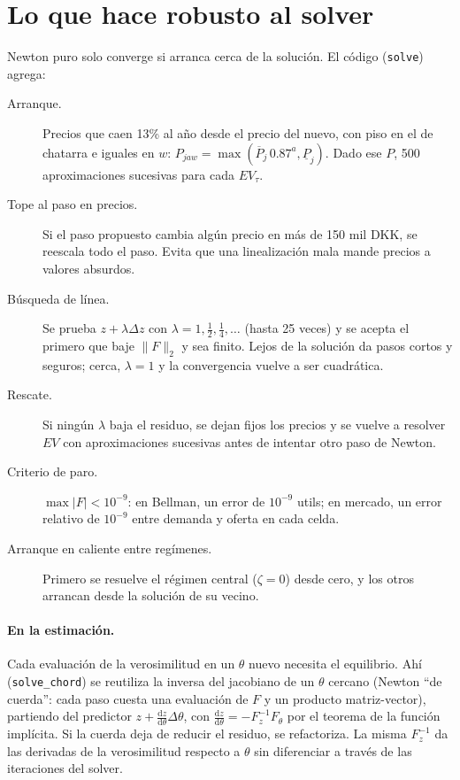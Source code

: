\documentclass{article}
\begin{document}
\section{Lo que hace robusto al solver}

Newton puro solo converge si arranca cerca de la solución. El código (\texttt{solve}) agrega:
\begin{description}
  \item[Arranque.] Precios que caen 13\% al año desde el precio del nuevo, con piso en el de
  chatarra e iguales en $w$: $P_{jaw}=\max(\overline P_j\,0.87^a,\underline P_j)$. Dado ese $P$,
  500 aproximaciones sucesivas para cada $EV_\tau$.
  \item[Tope al paso en precios.] Si el paso propuesto cambia algún precio en más de 150 mil DKK,
  se reescala todo el paso. Evita que una linealización mala mande precios a valores absurdos.
  \item[Búsqueda de línea.] Se prueba $z+\lambda\Delta z$ con $\lambda=1,\tfrac12,\tfrac14,\dots$
  (hasta 25 veces) y se acepta el primero que baje $\|F\|_2$ y sea finito. Lejos de la solución
  da pasos cortos y seguros; cerca, $\lambda=1$ y la convergencia vuelve a ser cuadrática.
  \item[Rescate.] Si ningún $\lambda$ baja el residuo, se dejan fijos los precios y se vuelve a
  resolver $EV$ con aproximaciones sucesivas antes de intentar otro paso de Newton.
  \item[Criterio de paro.] $\max|F|<10^{-9}$: en Bellman, un error de $10^{-9}$ utils; en
  mercado, un error relativo de $10^{-9}$ entre demanda y oferta en cada celda.
  \item[Arranque en caliente entre regímenes.] Primero se resuelve el régimen central
  ($\zeta=0$) desde cero, y los otros arrancan desde la solución de su vecino.
\end{description}

\paragraph{En la estimación.} Cada evaluación de la verosimilitud en un $\theta$ nuevo necesita el
equilibrio. Ahí (\texttt{solve\_chord}) se reutiliza la inversa del jacobiano de un $\theta$ cercano
(Newton ``de cuerda'': cada paso cuesta una evaluación de $F$ y un producto matriz-vector), partiendo
del predictor $z+\tfrac{\mathrm dz}{\mathrm d\theta}\Delta\theta$, con
$\tfrac{\mathrm dz}{\mathrm d\theta}=-F_z^{-1}F_\theta$ por el teorema de la función implícita. Si la
cuerda deja de reducir el residuo, se refactoriza. La misma $F_z^{-1}$ da las derivadas de la
verosimilitud respecto a $\theta$ sin diferenciar a través de las iteraciones del solver.
\end{document}
